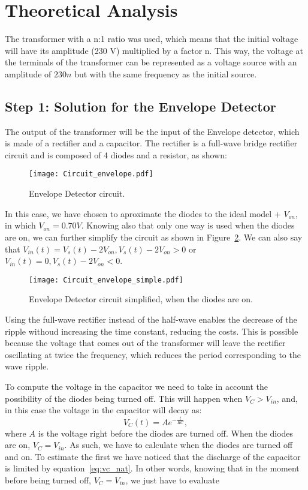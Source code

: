 \section{Theoretical Analysis}
\label{sec:analysis}

The transformer with a n:1 ratio was used, which means that the initial voltage will have its amplitude (230 V) multiplied by a factor n. This way, the voltage at the terminals of the transformer can be represented as a voltage source with an amplitude of $230n$ but with the same frequency as the initial source.

\subsection{Step 1: Solution for the Envelope Detector}

The output of the transformer will be the input of the Envelope detector, which is made of a rectifier and a capacitor. The rectifier is a full-wave bridge rectifier circuit  and is composed of 4 diodes and a resistor, as shown:

\begin{figure}[h] \centering
\texttt{[image: Circuit\_envelope.pdf]}
\caption{Envelope Detector circuit.}
\label{fig:ENV_CIR}
\end{figure}

In this case, we have chosen to aproximate the diodes to the ideal model + $V_{on}$, in which $V_{on} = 0.70V$. Knowing also that only one way is used when the diodes are on, we can further simplify the circuit as shown in Figure~\ref{fig:ENV_CIR_S}. We can also say that $V_{in}(t) = V_s(t) - 2V_{on}, V_s(t) - 2V_{on} > 0$ or $V_{in}(t) = 0, V_s(t) - 2V_{on} < 0$.

\begin{figure}[h] \centering
\texttt{[image: Circuit\_envelope\_simple.pdf]}
\caption{Envelope Detector circuit simplified, when the diodes are on.}
\label{fig:ENV_CIR_S}
\end{figure}

Using the full-wave rectifier instead of the half-wave enables the decrease of the ripple withoud increasing the time constant, reducing the costs. This is possible because the voltage that comes out of the transformer will leave the rectifier oscillating at twice the frequency, which reduces the period corresponding to the wave ripple.

To compute the voltage in the capacitor we need to take in account the possibility of the diodes being turned off. This will happen when $V_C > V_{in}$, and, in this case the voltage in the capacitor will decay as:
\begin{equation}
  V_{C}(t) = Ae^{-\frac{t}{RC}},
  \label{eq:vc_nat}
\end{equation}
where $A$ is the voltage right before the diodes are turned off.
When the diodes are on, $V_C = V_{in}$.
As such, we have to calculate when the diodes are turned off and on. To estimate the first we have noticed that the discharge of the capacitor is limited by equation~\ref{eq:vc_nat}. In other words, knowing that in the moment before being turned off, $V_C = V_{in}$, we just have to evaluate

